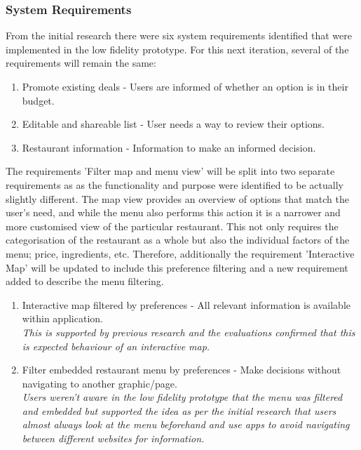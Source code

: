 \documentclass[a4 paper, 12pt]{article}
\begin{document}
    \subsubsection{System Requirements}
    From the initial research there were six system requirements identified that were implemented in the low fidelity prototype. For this next iteration, several of the requirements will remain the same:
    \begin{enumerate}
        \item Promote existing deals - Users are informed of whether an option is in their budget.
        \item Editable and shareable list - User needs a way to review their options.
        \item Restaurant information - Information to make an informed decision.
    \end{enumerate}      

    The requirements 'Filter map and menu view' will be split into two separate requirements as as the functionality and purpose were identified to be actually slightly different. The map view provides an overview of options that match the user's need, and while the menu also performs this action it is a narrower and more customised view of the particular restaurant. This not only requires the categorisation of the restaurant as a whole but also the individual factors of the menu; price, ingredients, etc. Therefore, additionally the requirement 'Interactive Map' will be updated to include this preference filtering and a new requirement added to describe the menu filtering.
        \begin{enumerate}[resume]
            \item Interactive map filtered by preferences - All relevant information is available within application. \\
                \textit{This is supported by previous research and the evaluations confirmed that this is expected behaviour of an interactive map.}
            \item Filter embedded restaurant menu by preferences - Make decisions without navigating to another graphic/page. \\
                \textit{Users weren't aware in the low fidelity prototype that the menu was filtered and embedded but supported the idea as per the initial research that users almost always look at the menu beforehand and use apps to avoid navigating between different websites for information.}
        \end{enumerate}
\end{document}
